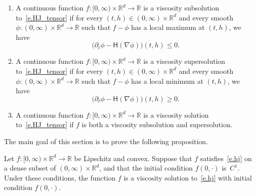 \documentclass[AHL,Unicode,longabstracts,published]{cedram}
\newcommand{\R}{\mathbb{R}}
\newcommand{\Rd}{{\mathbb{R}^d}}
\renewcommand{\H}{\mathsf{H}}
\renewcommand{\leq}{\leqslant}
\renewcommand{\geq}{\geqslant}
\begin{document}
\begin{defi}
\leavevmode
\begin{enumerate}
\item\label{defiA.1.1} A continuous function $f:[0,\infty)\times \R^d\to \R$ is a viscosity subsolution to~\eqref{e.HJ_tensor} if for every $(t,h) \in (0,\infty)\times \R^d $ and every smooth $\phi:(0,\infty)\times \R^d\to \R$ such that $f-\phi$ has a local maximum at $(t,h)$, we have
\[
\big(\partial_t \phi - \H(\nabla\phi)\big)(t,h)\leq 0.
\]


\item\label{defiA.1.2} A continuous function $f:[0,\infty)\times \R^d\to \R$ is a viscosity supersolution to~\eqref{e.HJ_tensor} if for every $(t,h) \in (0,\infty)\times \R^d$ and every smooth $\phi:(0,\infty)\times \R^d \to \R$ such that $f-\phi$ has a local minimum at $(t,h)$, we have
\[
\big(\partial_t \phi - \H(\nabla\phi)\big)(t,h)\geq 0.
\]

\item\label{defiA.1.3} A continuous function $f:[0,\infty)\times \R^d\to \R$ is a viscosity solution to~\eqref{e.HJ_tensor} if $f$ is both a viscosity subsolution and supersolution.
\end{enumerate}
\end{defi}

The main goal of this section is to prove the following proposition.
\begin{prop}\label{p.weak}
Let $f : [0,\infty) \times \R^d \to \R$ be Lipschitz and convex. Suppose that $f$ satisfies~\eqref{e.hj} on a dense subset of $(0,\infty) \times \Rd$, and that the initial condition $f(0,\cdot)$ is~$C^1$. Under these conditions, the function $f$ is a viscosity solution to~\eqref{e.hj} with initial condition $f(0,\cdot)$.
\end{prop}
\end{document}
